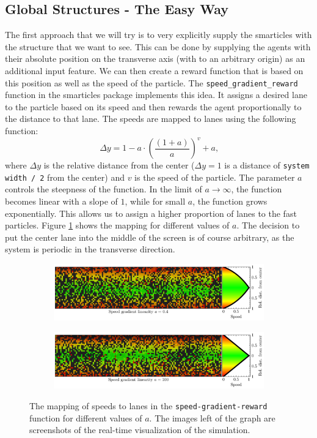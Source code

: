 \subsection{Global Structures - The Easy Way}
\label{subsec:global_structure_easy}
The first approach that we will try is to very explicitly supply the smarticles with the structure that we want to see. This can be done by supplying the agents with their absolute position on the transverse axis (with to an arbitrary origin) as an additional input feature. We can then create a reward function that is based on this position as well as the speed of the particle. The \texttt{speed\_gradient\_reward} function in the smarticles package implements this idea. It assigns a desired lane to the particle based on its speed and then rewards the agent proportionally to the distance to that lane. The speeds are mapped to lanes using the following function:
\begin{equation}
    \Delta y=1-a\cdot\left(\frac{\left(1+a\right)}{a}\right)^{v}+a \text{,}
\end{equation}
where $\Delta y$ is the relative distance from the center ($\Delta y=1$ is a distance of \texttt{system width / 2} from the center) and $v$ is the speed of the particle. The parameter $a$ controls the steepness of the function. In the limit of $a\rightarrow\infty$, the function becomes linear with a slope of $1$, while for small $a$, the function grows exponentially. This allows us to assign a higher proportion of lanes to the fast particles. Figure \ref{fig:speed_gradient} shows the mapping for different values of $a$. The decision to put the center lane into the middle of the screen is of course arbitrary, as the system is periodic in the transverse direction. 
\begin{figure}[H]
\centering
\begin{subfigure}{\textwidth}
    \centering
    \includegraphics[width=\textwidth]{speed_gradient_0.4}
\end{subfigure}
\begin{subfigure}{\textwidth}
    \centering
    \includegraphics[width=\textwidth]{speed_gradient_100}
\end{subfigure}
\caption{The mapping of speeds to lanes in the \texttt{speed-gradient-reward} function for different values of $a$. The images left of the graph are screenshots of the real-time visualization of the simulation.}
\label{fig:speed_gradient}
\end{figure}

